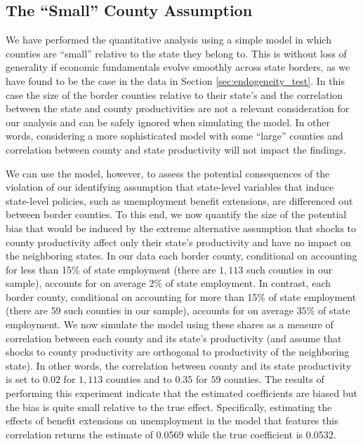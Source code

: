 \documentclass[12pt]{article}
\newcommand{\1}{\mathbf{1}}
\begin{document}
\begin{appendix}
\begin{table}[t]
\centering
\small
  \captionsetup{justification=centering}
  \caption{Estimated Permanent Effect of a 10 Week Benefit Extension \\ from Regressions Coefficients in Model Generated Data}\label{valid}

\vspace{-0.2cm}
\end{table}


\subsection{The ``Small'' County Assumption}

We have performed the quantitative analysis using a simple model in which counties are ``small'' relative to the state they belong to. This is without loss of generality if economic fundamentals evolve smoothly across state borders, as we have found to be the case in the data in Section \ref{sec:endogeneity_test}. In this case the size of the border counties relative to their state's and the correlation between the state and county productivities are not a relevant consideration for our analysis and can be safely ignored when simulating the model. In other words, considering a more sophisticated model with some ``large'' counties and correlation between county and state productivity will not impact the findings.



We can use the model, however, to assess the potential consequences of the violation of our identifying assumption that state-level variables that induce state-level policies, such as unemployment benefit extensions, are differenced out between border counties. To this end, we now quantify the size of the potential bias that would be induced by the extreme alternative assumption that shocks to county productivity affect only their state's productivity and have no impact on the neighboring states. In our data each border county, conditional on accounting for less than 15\% of state employment (there are $1,113$ such counties in our sample), accounts for on average $2\%$ of state employment. In contrast, each border county, conditional on accounting for more than 15\% of state employment (there are $59$ such counties in our sample), accounts for on average $35\%$ of state employment. We now simulate the model using these shares as a measure of correlation between each county and its state's productivity (and assume that shocks to county productivity are orthogonal to productivity of the neighboring state). In other words, the correlation between county and its state productivity is set to $0.02$ for $1,113$ counties and to $0.35$ for $59$ counties. The results of performing this experiment indicate that the estimated coefficients are biased but the bias is quite small relative to the true effect. Specifically, estimating the effects of benefit extensions on unemployment in the model that features this correlation returns the estimate of 0.0569 while the true coefficient is 0.0532.



\end{appendix}
\end{document}
